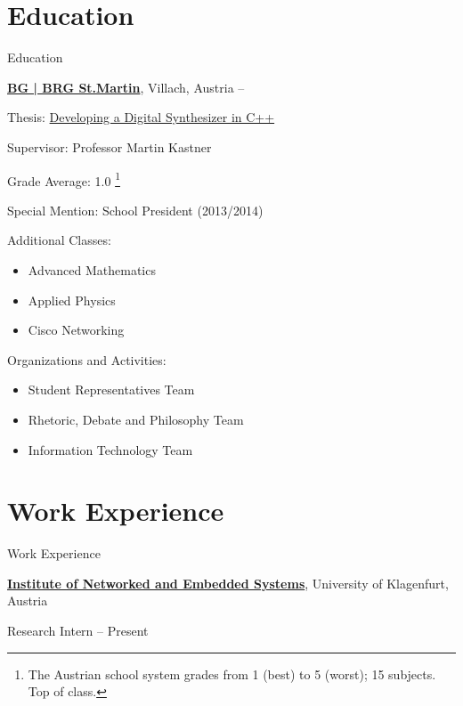 \begin{body}


\section{Education}
{Education}

\href{http://it-gymnasium.at}
{\textbf{BG | BRG St.Martin}},
Villach, Austria
\hfill
{} --
\begin{detail}

Thesis:
\href{http://issuu.com/petergoldsborough/docs/thesis}
{Developing a Digital Synthesizer in C++}
\par
Supervisor: Professor Martin Kastner
\par
Grade Average:
1.0 \footnote{The Austrian school system grades from 1 (best) to 5 (worst); 15 subjects. Top of class.}
\par
Special Mention: School President (2013/2014)

\begin{multicols}{2}
Additional Classes:
\begin{itemize}
  \item Advanced Mathematics
  \item Applied Physics
  \item Cisco Networking
\end{itemize}

Organizations and Activities:
\begin{itemize}
  \item Student Representatives Team
  \item Rhetoric, Debate and Philosophy Team
  \item Information Technology Team
\end{itemize}
\end{multicols}
\end{detail}


\section{Work Experience}
{Work Experience}

\href{https://nes.aau.at}
{\textbf{Institute of Networked and Embedded Systems}},
University of Klagenfurt, Austria

Research Intern
\hfill {} -- Present


\end{body}

